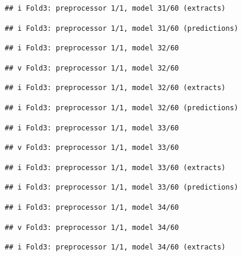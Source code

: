 \documentclass[
]{article}
\begin{document}
\begin{verbatim}
## i Fold3: preprocessor 1/1, model 31/60 (extracts)
\end{verbatim}

\begin{verbatim}
## i Fold3: preprocessor 1/1, model 31/60 (predictions)
\end{verbatim}

\begin{verbatim}
## i Fold3: preprocessor 1/1, model 32/60
\end{verbatim}

\begin{verbatim}
## v Fold3: preprocessor 1/1, model 32/60
\end{verbatim}

\begin{verbatim}
## i Fold3: preprocessor 1/1, model 32/60 (extracts)
\end{verbatim}

\begin{verbatim}
## i Fold3: preprocessor 1/1, model 32/60 (predictions)
\end{verbatim}

\begin{verbatim}
## i Fold3: preprocessor 1/1, model 33/60
\end{verbatim}

\begin{verbatim}
## v Fold3: preprocessor 1/1, model 33/60
\end{verbatim}

\begin{verbatim}
## i Fold3: preprocessor 1/1, model 33/60 (extracts)
\end{verbatim}

\begin{verbatim}
## i Fold3: preprocessor 1/1, model 33/60 (predictions)
\end{verbatim}

\begin{verbatim}
## i Fold3: preprocessor 1/1, model 34/60
\end{verbatim}

\begin{verbatim}
## v Fold3: preprocessor 1/1, model 34/60
\end{verbatim}

\begin{verbatim}
## i Fold3: preprocessor 1/1, model 34/60 (extracts)
\end{verbatim}
\end{document}
